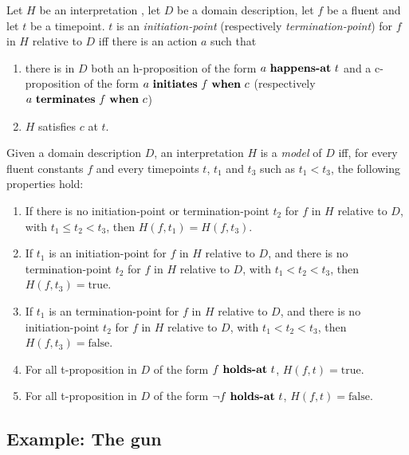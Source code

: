 \begin{definition}
  Let $H$ be an interpretation , let $D$ be a domain description, let $f$ be a fluent and let $t$ be a timepoint. $t$ is an \emph{initiation-point} (respectively \emph{termination-point}) for $f$ in $H$ relative to $D$ iff there is an action $a$ such that
  \begin{enumerate}
    \item there is in $D$ both an h-proposition of the form $a \text{  \textbf{happens-at} } t$ and a c-proposition of the form $a \text{ \textbf{initiates} } f \text{  \textbf{when} } c$ (respectively $a \text{ \textbf{terminates} } f \text{  \textbf{when} } c$)
    \item $H$ satisfies $c$ at $t$.
  \end{enumerate}
\end{definition}

\begin{definition}[model]
  Given a domain description $D$, an interpretation $H$  is a \emph{model} of $D$ iff, for every fluent constants $f$ and every timepoints $t$, $t_1$ and $t_3$ such as $t_1 < t_3$, the following properties hold:
  \begin{enumerate}
    \item If there is no initiation-point or termination-point $t_2$ for $f$ in $H$ relative to $D$, with $t_1 \leq t_2 < t_3$, then $H(f,t_1)=H(f,t_3)$.
    \item If $t_1$ is an initiation-point for $f$ in $H$ relative to $D$, and there is no termination-point $t_2$ for $f$ in $H$ relative to $D$, with $t_1 < t_2 < t_3$, then $H(f,t_3)=\text{true}$.
    \item If $t_1$ is an termination-point for $f$ in $H$ relative to $D$, and there is no initiation-point $t_2$ for $f$ in $H$ relative to $D$, with $t_1 < t_2 < t_3$, then $H(f,t_3)=\text{false}$.
    \item For all t-proposition in $D$ of the form $f \text{  \textbf{holds-at} } t$, $H(f,t)=\text{true}$.
    \item For all t-proposition in $D$ of the form $\neg f \text{  \textbf{holds-at} } t$, $H(f,t)=\text{false}$.
  \end{enumerate}
\end{definition}

\subsection{Example: The gun}

